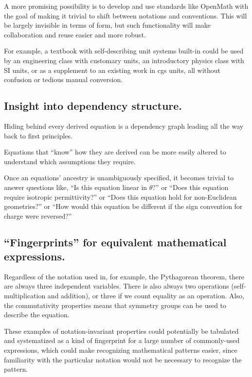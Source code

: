 \documentclass[12pt,letterpaper]{article}
\begin{document}

A more promising possibility is to develop and use standards like OpenMath
with the goal of making it trivial to shift between notations and conventions.
This will be largely invisible in terms of form,
but such functionality will make collaboration and reuse easier and more robust.

For example,
a textbook with self-describing unit systems built-in could be used by
an engineering class with customary units,
an introductory physics class with SI units,
or as a supplement to an existing work in cgs units,
all without confusion or tedious manual conversion.

\subsection{Insight into dependency structure.}

Hiding behind every derived equation is a dependency graph leading all the way back to first principles.

Equations that ``know'' how they are derived can be more easily altered to understand which assumptions they require.

Once an equations' ancestry is unambiguously specified,
it becomes trivial to answer questions like,
``Is this equation linear in $\theta$?''
or
``Does this equation require isotropic permittivity?''
or
``Does this equation hold for non-Euclidean geometries?''
or
``How would this equation be different if the sign convention for charge were reversed?''

\subsection{``Fingerprints'' for equivalent mathematical expressions.}

Regardless of the notation used in,
for example,
the Pythagorean theorem,
there are always three independent variables.
There is also always two operations (self-multiplication and addition),
or three if we count equality as an operation.
Also, the commutativity properties means that symmetry groups can be used to describe the equation.

These examples of notation-invariant properties could potentially be tabulated and systematized
as a kind of fingerprint for a large number of commonly-used expressions,
which could make recognizing mathematical patterns easier,
since familiarity with the particular notation would not be necessary to recognize the pattern.
\end{document}
